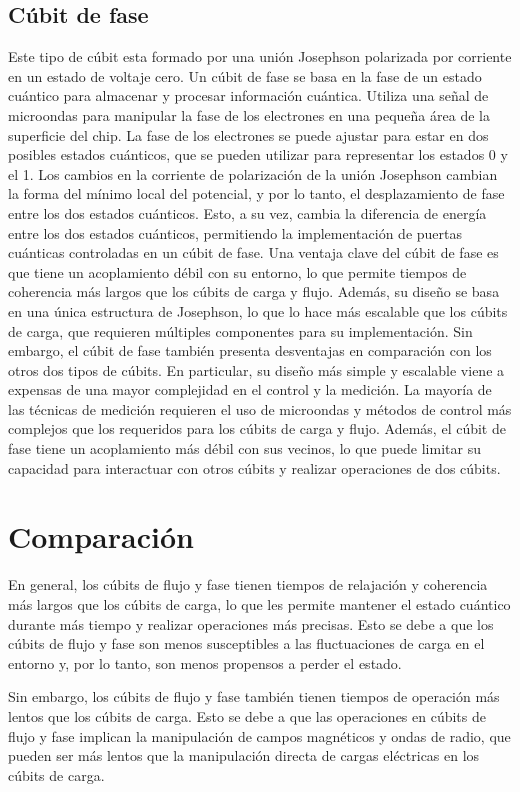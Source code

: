 \documentclass[11pt]{article}
\begin{document}
\subsection{Cúbit de fase}
Este tipo de cúbit esta formado por una unión Josephson polarizada por corriente en un estado de voltaje cero. Un cúbit de fase se basa en la fase de un estado cuántico para almacenar y procesar información cuántica. Utiliza una señal de microondas para manipular la fase de los electrones en una pequeña área de la superficie del chip. La fase de los electrones se puede ajustar para estar en dos posibles estados cuánticos, que se pueden utilizar para representar los estados 0 y el 1. Los cambios en la corriente de polarización de la unión Josephson cambian la forma del mínimo local del potencial, y por lo tanto, el desplazamiento de fase entre los dos estados cuánticos. Esto, a su vez, cambia la diferencia de energía entre los dos estados cuánticos, permitiendo la implementación de puertas cuánticas controladas en un cúbit de fase.
Una ventaja clave del cúbit de fase es que tiene un acoplamiento débil con su entorno, lo que permite tiempos de coherencia más largos que los cúbits de carga y flujo. Además, su diseño se basa en una única estructura de Josephson, lo que lo hace más escalable que los cúbits de carga, que requieren múltiples componentes para su implementación.
Sin embargo, el cúbit de fase también presenta desventajas en comparación con los otros dos tipos de cúbits. En particular, su diseño más simple y escalable viene a expensas de una mayor complejidad en el control y la medición. La mayoría de las técnicas de medición requieren el uso de microondas y métodos de control más complejos que los requeridos para los cúbits de carga y flujo. Además, el cúbit de fase tiene un acoplamiento más débil con sus vecinos, lo que puede limitar su capacidad para interactuar con otros cúbits y realizar operaciones de dos cúbits.
\section{Comparación} 
En general, los cúbits de flujo y fase tienen tiempos de relajación y coherencia más largos que los cúbits de carga, lo que les permite mantener el estado cuántico durante más tiempo y realizar operaciones más precisas. Esto se debe a que los cúbits de flujo y fase son menos susceptibles a las fluctuaciones de carga en el entorno y, por lo tanto, son menos propensos a perder el estado.

Sin embargo, los cúbits de flujo y fase también tienen tiempos de operación más lentos que los cúbits de carga. Esto se debe a que las operaciones en cúbits de flujo y fase implican la manipulación de campos magnéticos y ondas de radio, que pueden ser más lentos que la manipulación directa de cargas eléctricas en los cúbits de carga.
\end{document}
